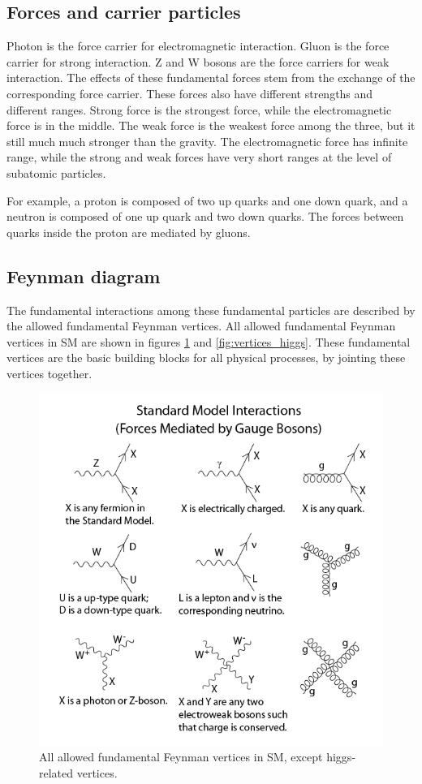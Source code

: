 \subsection{Forces and carrier particles}
Photon is the force carrier for electromagnetic interaction.
Gluon is the force carrier for strong interaction.
Z and W bosons are the force carriers for weak interaction.
The effects of these fundamental forces stem from the exchange of the corresponding force carrier.
These forces also have different strengths and different ranges.
Strong force is the strongest force, while the electromagnetic force is in the middle.
The weak force is the weakest force among the three, but it still much much stronger than the gravity.
The electromagnetic force has infinite range, while the strong and weak forces have very short ranges at the level of subatomic particles.

For example, a proton is composed of two up quarks and one down quark, and a neutron is composed of one up quark and two down quarks.
The forces between quarks inside the proton are mediated by gluons.

\subsection{Feynman diagram}
The fundamental interactions among these fundamental particles are described by the allowed fundamental Feynman vertices.
All allowed fundamental Feynman vertices in SM are shown in figures \ref{fig:vertices_SM} and \ref{fig:vertices_higgs}.
These fundamental vertices are the basic building blocks for all physical processes, by jointing these vertices together.

\begin{figure}
\centering
\includegraphics[width=\textwidth]{data/photo/theory/vertices_SM.png}
\caption{All allowed fundamental Feynman vertices in SM, except higgs-related vertices. \cite{vertices_SM}}
\label{fig:vertices_SM}
\end{figure}

